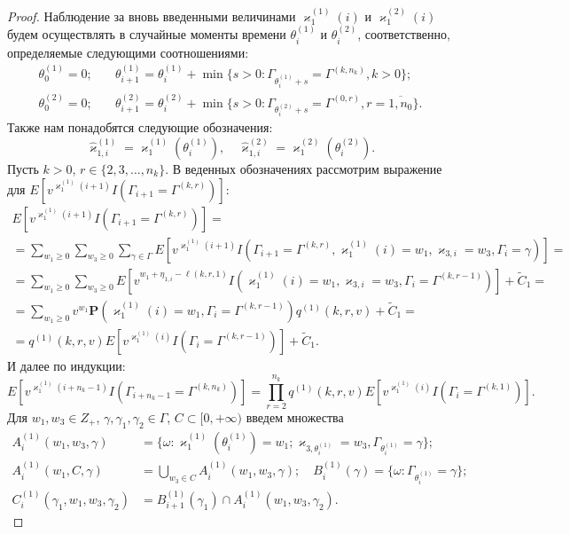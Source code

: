 \documentclass[12pt]{extarticle}
\theoremstyle{theorem}
\theoremstyle{remark}
\renewcommand{\Pr}{{\mathbf P}}
\begin{document}
\begin{proof}
Наблюдение за вновь введенными величинами $\varkappa_{1}^{(1)}(i)$ и $\varkappa_{1}^{(2)}(i)$ будем осуществлять в случайные моменты времени $\theta_{i}^{(1)}$ и $\theta_{i}^{(2)}$, соответственно, определяемые следующими соотношениями:
\begin{equation}
\begin{aligned}
  \theta_{0}^{(1)}=0; & \quad \theta_{i+1}^{(1)}=\theta_{i}^{(1)} + \min{\{s>0\colon \Gamma_{\theta_{i}^{(1)}+s} = \Gamma^{(k,n_k)}, k>0\}};\\
  \theta_{0}^{(2)}=0; & \quad  \theta_{i+1}^{(2)}=\theta_{i}^{(2)} + \min{\{s>0\colon \Gamma_{\theta_{i}^{(2)}+s} = \Gamma^{(0,r)}, r=\overline{1,n_0}\}}.
  \label{stop:times}
\end{aligned}
\end{equation}
Также нам понадобятся следующие обозначения:
\begin{equation}
  \hat{\varkappa}_{1,i}^{(1)}=\varkappa_{1}^{(1)}(\theta_{i}^{(1)}), \quad   \hat{\varkappa}_{1,i}^{(2)}=\varkappa_{1}^{(2)}(\theta_{i}^{(2)}).
  \label{stop:queue}
\end{equation}
Пусть $k>0$, $r \in \{2, 3, \ldots, n_k\}$. В веденных обозначениях рассмотрим выражение для $E[v^{\varkappa_{1}^{(1)}(i+1)} I(\Gamma_{i+1}=\Gamma^{(k,r)})]$:
\begin{multline*}
  E[v^{\varkappa_{1}^{(1)}(i+1)} I(\Gamma_{i+1}=\Gamma^{(k,r)})] = \\ =\sum_{w_1 \geqslant 0} \sum_{w_3 \geqslant 0} \sum_{\gamma \in \Gamma} E[v^{\varkappa_{1}^{(1)}(i+1)} I(\Gamma_{i+1}=\Gamma^{(k,r)}, \varkappa_{1}^{(1)}(i)=w_1, \varkappa_{3,i}=w_3,\Gamma_i=\gamma)] =\\= \sum_{w_1\geqslant 0} \sum_{w_3\geqslant 0} E[v^{w_1 + \eta_{1,i}-\ell(k,r,1)} I(\varkappa_{1}^{(1)}(i)=w_1, \varkappa_{3,i}=w_3,\Gamma_i=\Gamma^{(k,r-1)})] + \widetilde{C}_1=\\
  =\sum_{w_1\geqslant 0} v^{w_1 } \Pr (\varkappa_{1}^{(1)}(i)=w_1, \Gamma_i=\Gamma^{(k,r-1)}) q^{(1)}(k,r,v) + \widetilde{C}_1 = \\
  =q^{(1)}(k,r,v) E[v^{\varkappa_{1}^{(1)}(i)} I(\Gamma_i=\Gamma^{(k,r-1)})] + \widetilde{C}_1.
\end{multline*}
И далее по индукции:
\begin{equation*}
  E[v^{\varkappa_{1}^{(1)}(i+n_k-1)} I(\Gamma_{i+n_k-1}=\Gamma^{(k,n_k)})] = \prod_{r=2}^{n_k} q^{(1)}(k,r,v) E[v^{\varkappa_{1}^{(1)}(i)} I(\Gamma_{i}=\Gamma^{(k,1)})].
\end{equation*}
Для $w_1, w_3 \in Z_+$, $\gamma, \gamma_1, \gamma_2 \in \Gamma$, $C \subset [0, +\infty)$ введем множества 
\begin{align*}
  A_i^{(1)}(w_1,w_3,\gamma) &= \{\omega\colon \varkappa_{1}^{(1)}(\theta_{i}^{(1)})=w_1; \varkappa_{3,\theta_{i}^{(1)}}=w_3, \Gamma_{\theta_{i}^{(1)}}=\gamma\};\\
  A_i^{(1)}(w_1,C,\gamma) &= \bigcup_{w_3 \in C} A_i^{(1)}(w_1,w_3,\gamma);\quad B_i^{(1)}(\gamma) =\{\omega\colon \Gamma_{\theta_{i}^{(1)}}=\gamma\};\\
  C_i^{(1)}(\gamma_1,w_1,w_3,\gamma_2)&= B_{i+1}^{(1)}(\gamma_1) \cap A_i^{(1)}(w_1,w_3,\gamma_2) .
\end{align*}


\end{proof}
\end{document}
